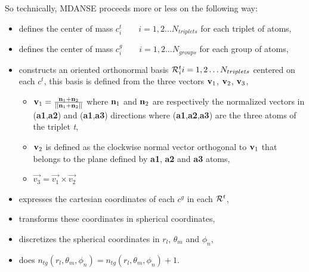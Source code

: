 \documentclass[a4paper,11pt]{article}
\begin{document}
So technically, \gls{MDANSE} proceeds more or less on the following way:
\begin{itemize}
\item defines the center of mass $c^t_i \qquad i = 1, 2 \ldots N_{triplets}$ for each triplet of atoms,
\item defines the center of mass $c^g_i \qquad i = 1, 2 \ldots N_{groups}$ for each group of atoms,
\item constructs an oriented orthonormal basis ${\cal R}^t_i i = 1, 2 \ldots N_{triplets}$ centered on each $c^t$, this 
basis is defined from the three vectors ${\bf v}_1$, ${\bf v}_2$, ${\bf v}_3$,
\begin{itemize}
\item ${\bf v}_1 = \frac{{\bf n}_{1} + {\bf n}_{2}}{||{\bf n}_{1} + {\bf n}_{2}||}$
where ${\bf n}_{1}$ and ${\bf n}_{2}$ are respectively the normalized vectors in (\textbf{a1},\textbf{a2}) 
and (\textbf{a1},\textbf{a3}) directions where (\textbf{a1},\textbf{a2},\textbf{a3}) are the three atoms of the triplet \textit{t},
\item ${\bf v}_2$ is defined as the clockwise normal vector orthogonal to ${\bf v}_1$ that belongs to the plane 
defined by \textbf{a1}, \textbf{a2} and \textbf{a3} atoms,
\item $\vec{v_3} = \vec{v_1} \times \vec{v_2}$
\end{itemize}
\item expresses the cartesian coordinates of each $c^g$ in each ${\cal R}^t$,
\item transforms these coordinates in spherical coordinates,
\item discretizes the spherical coordinates in $r_l$, $\theta_m$ and $\phi_n$,
\item does $n_{tg}(r_l,\theta_m,\phi_n) = n_{tg}(r_l,\theta_m,\phi_n) + 1$.
\end{itemize}
\end{document}
